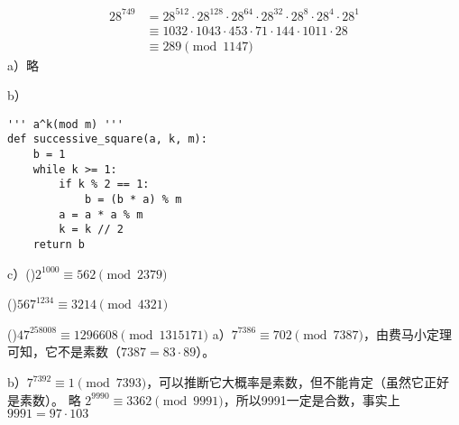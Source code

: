 \begin{align*}
28^{749}&=28^{512}\cdot28^{128}\cdot28^{64}\cdot28^{32}\cdot28^{8}\cdot28^{4}\cdot28^{1} \\
&\equiv 1032\cdot1043\cdot453\cdot71\cdot144\cdot1011\cdot28 \\
&\equiv 289\pmod{1147}
\end{align*}
%
\exercise a）略\par
b）
\begin{lstlisting}
''' a^k(mod m) '''
def successive_square(a, k, m):
    b = 1
    while k >= 1:
        if k % 2 == 1:
            b = (b * a) % m
        a = a * a % m
        k = k // 2
    return b
\end{lstlisting}
c）()$2^{1000}\equiv562\pmod{2379}$\par()$567^{1234}\equiv3214\pmod{4321}$\par
()$47^{258008}\equiv1296608\pmod{1315171}$
%
\exercise a）$7^{7386}\equiv702\pmod{7387}$，由费马小定理可知，它不是素数（$7387=83\cdot89$）。\par
b）$7^{7392}\equiv1\pmod{7393}$，可以推断它大概率是素数，但不能肯定（虽然它正好是素数）。
%
\exercise 略
%
\exercise $2^{9990}\equiv3362\pmod{9991}$，所以9991一定是合数，事实上$9991=97\cdot103$